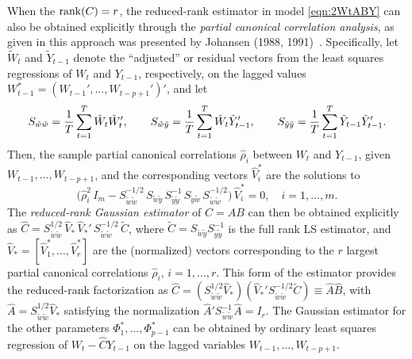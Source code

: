 When the  $\operatorname{rank}(C)= r$, the reduced-rank estimator in model \eqref{eqn:2WtABY} can also be obtained explicitly through the \emph{partial canonical correlation analysis}, as given in this approach was presented by Johansen (1988, 1991)~\cite{johansen1988statistical,johansen1991estimation}. Specifically, let $\tilde{W}_t$ and $\tilde{Y}_{t-1}$ denote the ``adjusted'' or residual vectors from the least squares regressions of $W_t$ and $Y_{t-1}$, respectively, on the lagged values $W_{t-1}^*= (W_{t-1}' ,\ldots, W_{t-p+1}' )'$, and let
	\[
	S_{\tilde{w}\tilde{w}} = \frac{1}{T} \sum_{t=1}^T \tilde{W}_t \tilde{W}_t', \qquad \hfill S_{\tilde{w}\tilde{y}}= \frac{1}{T} \sum_{t=1}^T \tilde{W}_t \tilde{Y}_{t-1}' ,\qquad \hfill S_{\tilde{y}\tilde{y}}= \frac{1}{T} \sum_{t=1}^T \tilde{Y}_{t-1} \tilde{Y}_{t-1}' . \hfill
	\]
Then, the sample partial canonical correlations $\hat{\rho}_i $ between $W_t$ and $Y_{t-1}$, given $W_{t-1} ,\ldots, W_{t-p+1} $, and the corresponding vectors $\hat{V}_i^*$ are the solutions to
	\begin{equation} \label{eqn:2rhohatM}
	\big( \hat{\rho}_i^2\, I_m - S_{\tilde{w}\tilde{w}}^{-1/2} \, S_{\tilde{w}\tilde{y}}\, S_{\tilde{y}\tilde{y}}^{-1}\, S_{\tilde{y}\tilde{w}}\, S_{\tilde{w}\tilde{w}}^{-1/2} \big)\, \hat{V}_i^* = 0 , \quad i = 1 ,\ldots, m.
	\end{equation}
The \emph{reduced-rank Gaussian estimator} of $C= AB$ can then be obtained explicitly as $\hat{C} = S_{\tilde{w}\tilde{w}}^{1/2}\, \hat{V}_* \,\hat{V}_*' \, S_{\tilde{w}\tilde{w}}^{-1/2}\, \tilde{C}$, where $\tilde{C} = S_{\tilde{w}\tilde{y}} S_{\tilde{y}\tilde{y}}^{-1} $ is the full rank LS estimator, and $\hat{V}_* = [ \hat{V}_1^* , \ldots, \hat{V}_r^* ]$ are the (normalized) vectors corresponding to the $r$ largest partial canonical correlations $\hat{\rho}_i $, $i = 1 ,\ldots, r$. This form of the estimator provides the reduced-rank factorization as $\hat{C} = (S_{\tilde{w}\tilde{w}}^{1/2} \hat{V}_* ) ( \hat{V}_*' S_{\tilde{w}\tilde{w}}^{-1/2} \tilde{C} ) \equiv \hat{A} \hat{B}$, with $\hat{A} = S_{\tilde{w}\tilde{w}}^{1/2} \hat{V}_*$
satisfying the normalization $\hat{A}' S_{\tilde{w}\tilde{w}}^{-1} \hat{A} = I_r$.  The Gaussian estimator for the other parameters $\Phi_1^* ,\ldots, \Phi_{p-1}^*$ can be obtained by ordinary least squares regression of $W_t - \hat{C} Y_{t-1} $ on the lagged variables $W_{t-1} ,\ldots, W_{t-p+1}$.


